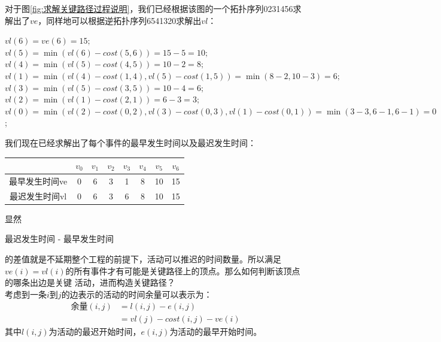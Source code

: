 对于图\ref{fig:求解关键路径过程说明}，我们已经根据该图的一个拓扑序列0231456求解出了$ve$，同样地可以根据逆拓扑序列6541320求解出$vl$：
\begin{bulk}
    $vl(6) = ve(6) = 15;$\\
    $vl(5) = \min(vl(6) - cost(5, 6)) = 15 - 5 = 10;$\\
    $vl(4) = \min(vl(5) - cost(4, 5)) = 10 - 2 = 8;$\\
    $vl(1) = \min(vl(4) - cost(1, 4), vl(5) - cost(1, 5)) = \min(8 - 2, 10 - 3) = 6;$\\
    $vl(3) = \min(vl(5) - cost(3, 5)) = 10 - 4 = 6;$\\
    $vl(2) = \min(vl(1) - cost(2, 1)) = 6 - 3 = 3;$\\
    $vl(0) = \min(vl(2) - cost(0, 2), vl(3) - cost(0, 3), vl(1) - cost(0, 1)) = \min(3 - 3, 6 - 1, 6 - 1) = 0$;
\end{bulk}

我们现在已经求解出了每个事件的最早发生时间以及最迟发生时间：

\medskip
\begin{center}
    \begin{tabular}{cccccccc}
    \hline
                  & $v_0$ & $v_1$ & $v_2$ & $v_3$ & $v_4$ & $v_5$ & $v_6$ \\
    \hline
    最早发生时间ve & 0 & 6 & 3 & 1 & 8 & 10 & 15\\
    最迟发生时间vl & 0 & 6 & 3 & 6 & 8 & 10 & 15\\
    \hline
\end{tabular}
\end{center}
\medskip

显然
\begin{bulk}
    \begin{center}
        最迟发生时间 - 最早发生时间    
    \end{center}
\end{bulk}
的差值就是不延期整个工程的前提下，活动可以推迟的时间数量。所以满足 \(ve(i)=vl(i)\)的所有事件才有可能是关键路径上的顶点。那么如何判断该顶点的哪条出边是关键
活动，进而构造关键路径？\\

考虑到一条$i$到$j$的边表示的活动的时间余量可以表示为：
\[
\begin{aligned}
\text{余量}(i,j)&=l(i,j)-e(i,j)\\
&=vl(j)-cost(i,j)-ve(i)
\end{aligned}
\]
其中$l(i,j)$为活动的最迟开始时间，$e(i,j)$为活动的最早开始时间。

